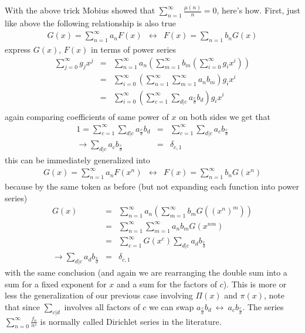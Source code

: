 \documentclass[aps,preprint,preprintnumbers,nofootinbib,showpacs,prd]{revtex4-1}
\newcommand{\nbea}{\begin{eqnarray*}}
\newcommand{\neea}{\end{eqnarray*}}
\begin{document}
With the above trick Mobius showed that $\sum_{n=1}^\infty \frac{\mu(n)}{n} = 0$, here's how. First, just like above the following relationship is also true
%
\nbea
G(x) = \sum_{n=1}^\infty a_n F(x) &\longleftrightarrow& F(x) = \sum_{n=1} b_n G(x)
\neea
%
express $G(x)$, $F(x)$ in terms of power series
%
\nbea
\sum_{j=0}^\infty g_j x^j & = & \sum_{n=1}^\infty a_n \left(\sum_{m=1}^\infty b_m \left(\sum_{i=0}^\infty g_i x^i\right)\right) \\
& = &\sum_{i=0}^\infty \left( \sum_{n=1}^\infty\sum_{m=1}^\infty a_n  b_m \right) g_i x^i \\
& = &\sum_{i=0}^\infty \left( \sum_{c=1}^\infty\sum_{d|c} a_{\frac{c}{d}}  b_{d} \right) g_i x^i \\
\neea
%
again comparing coefficients of same power of $x$ on both sides we get that
%
\nbea
1 = \sum_{c=1}^\infty\sum_{d|c} a_{\frac{c}{d}}  b_{d} & = & \sum_{c=1}^\infty\sum_{d|c} a_c  b_{\frac{c}{d}} \\
\to \sum_{d|c} a_c  b_{\frac{c}{d}} & = & \delta_{c,1}
\neea
%
this can be immediately generalized into
%
\nbea
G(x) = \sum_{n=1}^\infty a_n F(x^n) &\longleftrightarrow& F(x) = \sum_{n=1}^\infty b_n G(x^n)
\neea
%
because by the same token as before (but not expanding each function into power series)
%
\nbea
G(x) & = & \sum_{n=1}^\infty a_n \left(\sum_{m=1}^\infty b_m G\left (\left(x^n\right)^m\right)\right) \\
& = & \sum_{n=1}^\infty \sum_{m=1}^\infty a_n b_m G(x^{nm}) \\
& = & \sum_{c=1}^\infty G(x^c) \sum_{d|c} a_{d} b_{\frac{c}{d}} \\
\to \sum_{d|c} a_{d} b_{\frac{c}{d}} & = & \delta_{c,1}
\neea
%
with the same conclusion (and again we are rearranging the double sum into a sum for a fixed exponent for $x$ and a sum for the factors of $c$). This is more or less the generalization of our previous case involving $\Pi(x)$ and $\pi(x)$, note that since $\sum_{c|d}$ involves all factors of $c$ we can swap $a_{\frac{c}{d}}  b_{d} ~\leftrightarrow~ a_c  b_{\frac{c}{d}}$. The series $\sum_{n=0}^\infty \frac{f_n}{n^s}$ is normally called Dirichlet series in the literature.
\end{document}
